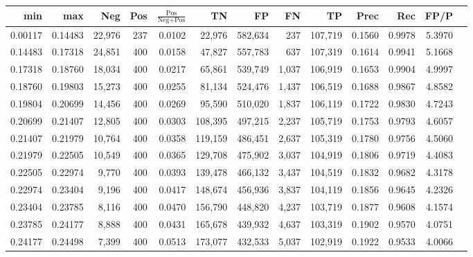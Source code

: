 \begin{tabular}{rrrrrrrrrrrrr}
\toprule
    min &     max &    Neg &   Pos & $\frac{\text{Pos}}{\text{Neg}+\text{Pos}}$ &      TN &      FP &      FN &      TP &   Prec &    Rec &   FP/P \\
\midrule
0.00117 & 0.14483 & 22,976 &   237 &                                     0.0102 &  22,976 & 582,634 &     237 & 107,719 & 0.1560 & 0.9978 & 5.3970 \\
0.14483 & 0.17318 & 24,851 &   400 &                                     0.0158 &  47,827 & 557,783 &     637 & 107,319 & 0.1614 & 0.9941 & 5.1668 \\
0.17318 & 0.18760 & 18,034 &   400 &                                     0.0217 &  65,861 & 539,749 &   1,037 & 106,919 & 0.1653 & 0.9904 & 4.9997 \\
0.18760 & 0.19803 & 15,273 &   400 &                                     0.0255 &  81,134 & 524,476 &   1,437 & 106,519 & 0.1688 & 0.9867 & 4.8582 \\
0.19804 & 0.20699 & 14,456 &   400 &                                     0.0269 &  95,590 & 510,020 &   1,837 & 106,119 & 0.1722 & 0.9830 & 4.7243 \\
0.20699 & 0.21407 & 12,805 &   400 &                                     0.0303 & 108,395 & 497,215 &   2,237 & 105,719 & 0.1753 & 0.9793 & 4.6057 \\
0.21407 & 0.21979 & 10,764 &   400 &                                     0.0358 & 119,159 & 486,451 &   2,637 & 105,319 & 0.1780 & 0.9756 & 4.5060 \\
0.21979 & 0.22505 & 10,549 &   400 &                                     0.0365 & 129,708 & 475,902 &   3,037 & 104,919 & 0.1806 & 0.9719 & 4.4083 \\
0.22505 & 0.22974 &  9,770 &   400 &                                     0.0393 & 139,478 & 466,132 &   3,437 & 104,519 & 0.1832 & 0.9682 & 4.3178 \\
0.22974 & 0.23404 &  9,196 &   400 &                                     0.0417 & 148,674 & 456,936 &   3,837 & 104,119 & 0.1856 & 0.9645 & 4.2326 \\
0.23404 & 0.23785 &  8,116 &   400 &                                     0.0470 & 156,790 & 448,820 &   4,237 & 103,719 & 0.1877 & 0.9608 & 4.1574 \\
0.23785 & 0.24177 &  8,888 &   400 &                                     0.0431 & 165,678 & 439,932 &   4,637 & 103,319 & 0.1902 & 0.9570 & 4.0751 \\
0.24177 & 0.24498 &  7,399 &   400 &                                     0.0513 & 173,077 & 432,533 &   5,037 & 102,919 & 0.1922 & 0.9533 & 4.0066 \\

\end{tabular}
